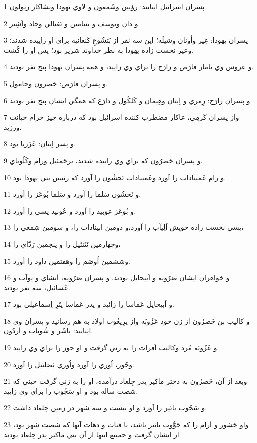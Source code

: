 \par 1 پسران اسرائيل اينانند: رؤبين وشَمعون و لاوي يهودا ويسّاکار زبِولون
\par 2 و دان ويوسف و بنيامين و نَفتالي وجاد واَشِير.
\par 3 پسران يهودا: عِير واُونان وشيلَه؛ اين سه نفر از بَتشُوعِ کَنعانيه براي او زاييده شدند؛ وعير نخست زاده يهودا به نظر خداوند شرير بود؛ پس او را کُشت.
\par 4 و عروس وي تامار فارَص و زارَح را براي وي زاييد، و همه پسران يهودا پنج نفر بودند.
\par 5 و پسران فارَص: حَصرون وحامول.
\par 6 و پسران زارَح: زِمري و اِيتان وهِيمان و کَلکُول و دارَع که همگي ايشان پنج نفر بودند.
\par 7 واز پسران کَرمِي، عاکار مضطرب کننده اسرائيل بود که درباره چيز حرام خيانت ورزيد.
\par 8 و پسر اِيتان: عَزَريا بود.
\par 9 و پسران حَصرُون که براي وي زاييده شدند، يرحَمئيل ورام وکَلُوباي.
\par 10 و رام عَميناداب را آورد وعَميناداب نَحشُون را آورد که رئيس بني يهودا بود.
\par 11 و نَحشُون سَلما را آورد و سَلما بُوعَز را آورد.
\par 12 و بُوعَز عوبيد را آورد و عُوبيد يسي را آورد.
\par 13 يسي نخست زاده خويش اَلِيآب را آورد،و دومين ابيناداب را، و سومين شِمعي را،
\par 14 وچهارمين نَتَنئيل را و پنجمين رَدّاي را،
\par 15 وششمين اُوصَم را وهفتمين داود را آورد.
\par 16 و خواهران ايشان صَرُويه و اَبيحايل بودند. و پسران صَرُويه، اَبشاي و يوآب و عَسائيل، سه نفر بودند.
\par 17 و اَبيحايل عَماسا را زائيد و پدر عَماسا يتَرِ اِسماعيلي بود.
\par 18 و کاليب بن حَصرُون از زن خود عَزُوبَه واز يرِيعُوت اولاد به هم رسانيد و پسران وي اينانند: ياشَر و شُوباب و اَردُون.
\par 19 و عَزُوبَه مُرد وکاليب اَفرات را به زني گرفت و او حور را براي وي زاييد.
\par 20 وحُور، اُوري را آورد واُوري بَصَلئيل را آورد.
\par 21 وبعد از آن، حَصرُون به دختر ماکير پدر جِلعاد درآمده، او را به زني گرفت حيني که شصت ساله بود و او سَجُوب را براي وي زاييد.
\par 22 و سَجُوب يائير را آورد و او بيست و سه شهر در زمين جِلعاد داشت.
\par 23 واو جَشور و اَرام را که حَوُّوب يائير باشد، با قنات و دهات آنها که شصت شهر بود، از ايشان گرفت و جمييع اينها از آن بني ماکير پدر جِلعاد بودند.
